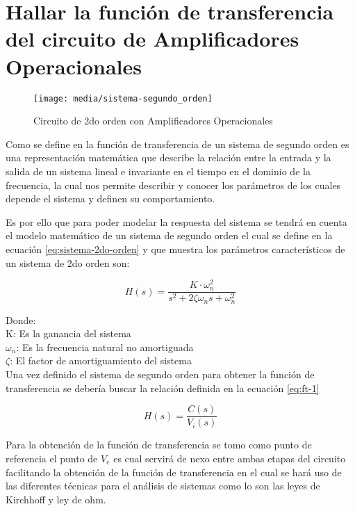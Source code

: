 \documentclass[conference]{IEEEtran}
\begin{document}
	
	\section{Hallar la función de transferencia del circuito de Amplificadores Operacionales}
	
	\begin{figure}
		\centering
		\texttt{[image: media/sistema-segundo\_orden]}
		\caption{Circuito de 2do orden con Amplificadores Operacionales}
		\label{fig:sistema-segundoorden}
	\end{figure}
	
	Como se define en \cite{ogata2015} la función de transferencia de un sistema de segundo orden es una representación matemática que describe la relación entre la entrada y la salida de un sistema lineal e invariante en el tiempo en el dominio de la frecuencia, la cual nos permite describir y conocer los parámetros de los cuales depende el sistema y definen su comportamiento.
	
	Es por ello que para poder modelar la respuesta del sistema se tendrá en cuenta el modelo matemático de un sistema de segundo orden el cual se define en la ecuación \ref{eq:sistema-2do-orden} y que muestra los parámetros característicos de un sistema de 2do orden son:
	
	\begin{equation}
		H(s) = \frac{K \cdot \omega_n^2}{s^2 + 2\zeta\omega_n s + \omega_n^2}
		\label{eq:sistema-2do-orden}
	\end{equation}
	
	Donde: \\ 
	K: Es la ganancia del sistema \\
	$\omega_n$: Es la frecuencia natural no amortiguada \\
	$\zeta$: El factor de amortiguamiento del sistema \\
	
	Una vez definido el sistema de segundo orden para obtener la función de transferencia se debería buscar la relación definida en la ecuación \ref{eq:ft-1}
	
	\begin{equation}
		H(s) = \frac{C(s)}{V_i(s)}
		\label{eq:ft-1}
	\end{equation}
	
	Para la obtención de la función de transferencia se tomo como punto de referencia el punto de $V_e$ es cual servirá de nexo entre ambas etapas del circuito facilitando la obtención de la función de transferencia en el cual se hará uso de las diferentes técnicas para el análisis de sistemas como lo son las leyes de Kirchhoff y ley de ohm.
	
\end{document}

